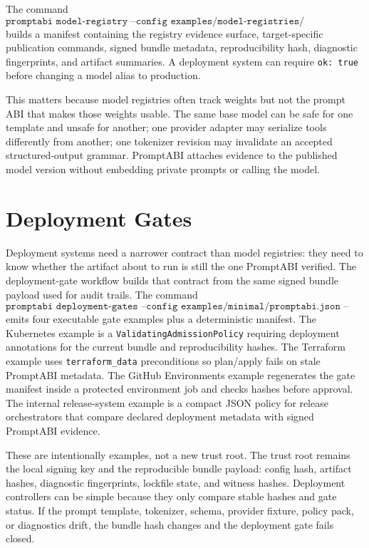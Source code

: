 \documentclass[10pt]{article}
\begin{document}
The command
\[
\texttt{promptabi model-registry --config examples/model-registries/promptabi.json --targets examples/model-registries/targets.json}
\]
builds a manifest containing the registry evidence surface, target-specific
publication commands, signed bundle metadata, reproducibility hash, diagnostic
fingerprints, and artifact summaries. A deployment system can require
\texttt{ok: true} before changing a model alias to production.

This matters because model registries often track weights but not the prompt ABI
that makes those weights usable. The same base model can be safe for one
template and unsafe for another; one provider adapter may serialize tools
differently from another; one tokenizer revision may invalidate an accepted
structured-output grammar. PromptABI attaches evidence to the published model
version without embedding private prompts or calling the model.

\newpage
\section{Deployment Gates}

Deployment systems need a narrower contract than model registries: they need to
know whether the artifact about to run is still the one PromptABI verified. The
deployment-gate workflow builds that contract from the same signed bundle
payload used for audit trails. The command
\[
\texttt{promptabi deployment-gates --config examples/minimal/promptabi.json --output-dir /tmp/gates}
\]
emits four executable gate examples plus a deterministic manifest. The
Kubernetes example is a \texttt{ValidatingAdmissionPolicy} requiring deployment
annotations for the current bundle and reproducibility hashes. The Terraform
example uses \texttt{terraform\_data} preconditions so plan/apply fails on stale
PromptABI metadata. The GitHub Environments example regenerates the gate
manifest inside a protected environment job and checks hashes before approval.
The internal release-system example is a compact JSON policy for release
orchestrators that compare declared deployment metadata with signed PromptABI
evidence.

These are intentionally examples, not a new trust root. The trust root remains
the local signing key and the reproducible bundle payload: config hash, artifact
hashes, diagnostic fingerprints, lockfile state, and witness hashes. Deployment
controllers can be simple because they only compare stable hashes and gate
status. If the prompt template, tokenizer, schema, provider fixture, policy pack,
or diagnostics drift, the bundle hash changes and the deployment gate fails
closed.
\end{document}
